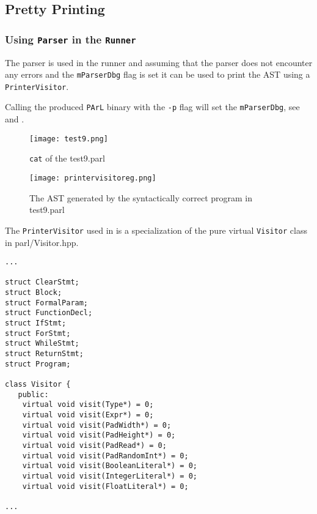 \subsection{Pretty Printing}

\subsubsection{Using \texttt{Parser} in the \texttt{Runner}}

The parser is used in the runner and assuming that the parser
does not encounter any errors and the \texttt{mParserDbg} flag
is set it can be used to print the AST using a
\texttt{PrinterVisitor}.



Calling the produced \texttt{PArL} binary with the \texttt{-p}
flag will set the \texttt{mParserDbg}, see  and
.

\begin{figure}[H]
\centering
\texttt{[image: test9.png]}
\caption{\texttt{cat} of the test9.parl}
\label{fig:test9}
\end{figure}

\begin{figure}[H]
\centering
\texttt{[image: printervisitoreg.png]}
\caption{The AST generated by the syntactically correct program
in test9.parl}
\label{fig:parseeg}
\end{figure}



The \texttt{PrinterVisitor} used in  is
a specialization of the pure virtual \texttt{Visitor} class
in parl/Visitor.hpp.

\begin{lstlisting}[caption={A segment of the pure virtual
\texttt{Visitor} class (parl/Visitor.hpp)},
label=lst:genericvisitor]
...

struct ClearStmt;
struct Block;
struct FormalParam;
struct FunctionDecl;
struct IfStmt;
struct ForStmt;
struct WhileStmt;
struct ReturnStmt;
struct Program;

class Visitor {
   public:
    virtual void visit(Type*) = 0;
    virtual void visit(Expr*) = 0;
    virtual void visit(PadWidth*) = 0;
    virtual void visit(PadHeight*) = 0;
    virtual void visit(PadRead*) = 0;
    virtual void visit(PadRandomInt*) = 0;
    virtual void visit(BooleanLiteral*) = 0;
    virtual void visit(IntegerLiteral*) = 0;
    virtual void visit(FloatLiteral*) = 0;

...
\end{lstlisting}


